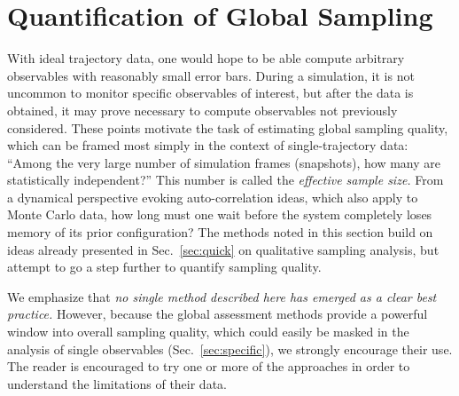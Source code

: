 \section{Quantification of Global Sampling}
\label{sec:global}


With ideal trajectory data, one would hope to be able compute arbitrary observables with reasonably small error bars.
During a simulation, it is not uncommon to monitor specific observables of interest, but after the data is obtained, it may prove necessary to compute observables not previously considered.
These points motivate the task of estimating global sampling quality, which can be framed most simply in the context of single-trajectory data:
``Among the very large number of simulation frames (snapshots), how many are statistically independent?''
This number is called the \emph{effective sample size.}
From a dynamical perspective evoking auto-correlation ideas, which also apply to Monte Carlo data, how long must one wait before the system completely loses memory of its prior configuration?
The methods noted in this section build on ideas already presented in Sec.\ \ref{sec:quick} on qualitative sampling analysis, but attempt to go a step further to quantify sampling quality.

We emphasize that \emph{no single method described here has emerged as a clear best practice.}
However, because the global assessment methods provide a powerful window into overall sampling quality, which could easily be masked in the analysis of single observables (Sec.\ \ref{sec:specific}), we strongly encourage their use.
The reader is encouraged to try one or more of the approaches in order to understand the limitations of their data.


